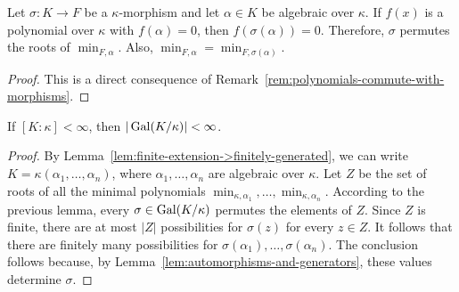 \begin{lem}
    Let\/ $\sigma\colon K\to F$ be a\/ $\kappa$-morphism and let\/ $\alpha\in K$ be algebraic over\/ $\kappa$. If\/ $f(x)$ is a polynomial over\/ $\kappa$ with\/ $f(\alpha) = 0$, then\/ $f(\sigma(\alpha))=0$. Therefore, $\sigma$ permutes the roots of\/ $\min_{F,\alpha}$. Also, $\min_{F,\alpha}=\min_{F,\sigma(\alpha)}$.
\end{lem}

\begin{proof}
    This is a direct consequence of Remark~\ref{rem:polynomials-commute-with-morphisms}.
\end{proof}

\begin{thm}\label{thm:finite-extension-finite-galois}
    If\/ $[K: \kappa] < \infty$, then\/ $|\operatorname{Gal}(K/\kappa)|<\infty$.
\end{thm}

\begin{proof}
    By Lemma~\ref{lem:finite-extension->finitely-generated}, we can write $K = \kappa(\alpha_1, \dots, \alpha_n)$, where $\alpha_1, \dots, \alpha_n$ are algebraic over $\kappa$. Let $Z$ be the set of roots of all the minimal polynomials $\min_{\kappa, \alpha_1}, \dots, \min_{\kappa, \alpha_n}$. According to the previous lemma, every $\sigma \in \operatorname{Gal}(K/\kappa)$ permutes the elements of $Z$. Since $Z$ is finite, there are at most $|Z|$ possibilities for $\sigma(z)$ for every $z \in Z$. It follows that there are finitely many possibilities for $\sigma(\alpha_1), \dots, \sigma(\alpha_n)$. The conclusion follows because, by Lemma~\ref{lem:automorphisms-and-generators}, these values determine $\sigma$.


\end{proof}

